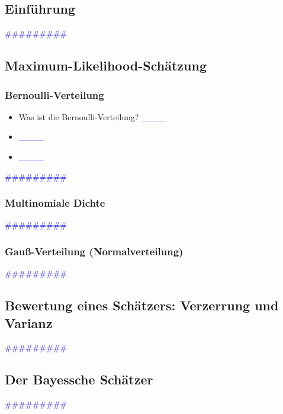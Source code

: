 \documentclass{article}
\begin{document}
  \subsection{Einführung} %
      \textcolor{blue}{\#\#\#\#\#\#\#\#\#}
  \subsection{Maximum-Likelihood-Schätzung} %
    \subsubsection{Bernoulli-Verteilung} %
      \begin{itemize}
      \color{red}
        \item Was ist die Bernoulli-Verteilung? \textcolor{blue}{\_\_\_\_}
        \item  \textcolor{blue}{\_\_\_\_}
        \item  \textcolor{blue}{\_\_\_\_}
      \end{itemize}
      \textcolor{blue}{\#\#\#\#\#\#\#\#\#}
    \subsubsection{Multinomiale Dichte} %
      \textcolor{blue}{\#\#\#\#\#\#\#\#\#}
    \subsubsection{Gauß-Verteilung (Normalverteilung)} %
      \textcolor{blue}{\#\#\#\#\#\#\#\#\#}
  \subsection{Bewertung eines Schätzers: Verzerrung und Varianz} %
      \textcolor{blue}{\#\#\#\#\#\#\#\#\#}
  \subsection{Der Bayessche Schätzer} %
      \textcolor{blue}{\#\#\#\#\#\#\#\#\#}
\end{document}
